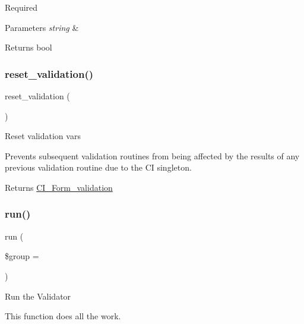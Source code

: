 Required


\begin{DoxyParams}{Parameters}
{\em string} & \\
\hline
\end{DoxyParams}
\begin{DoxyReturn}{Returns}
bool 
\end{DoxyReturn}
\mbox{\label{class_c_i___form__validation_a84b8bd64032f6be532968015cba11361}} 
\subsubsection{\texorpdfstring{reset\+\_\+validation()}{reset\_validation()}}
{\footnotesize\ttfamily reset\+\_\+validation (\begin{DoxyParamCaption}{ }\end{DoxyParamCaption})}

Reset validation vars

Prevents subsequent validation routines from being affected by the results of any previous validation routine due to the CI singleton.

\begin{DoxyReturn}{Returns}
\mbox{\hyperlink{class_c_i___form__validation}{C\+I\+\_\+\+Form\+\_\+validation}} 
\end{DoxyReturn}
\mbox{\label{class_c_i___form__validation_a304567453dbe1809dc0dc3ad99918383}} 
\subsubsection{\texorpdfstring{run()}{run()}}
{\footnotesize\ttfamily run (\begin{DoxyParamCaption}\item[{}]{\$group = {\ttfamily \textquotesingle{}\textquotesingle{}} }\end{DoxyParamCaption})}

Run the Validator

This function does all the work.


